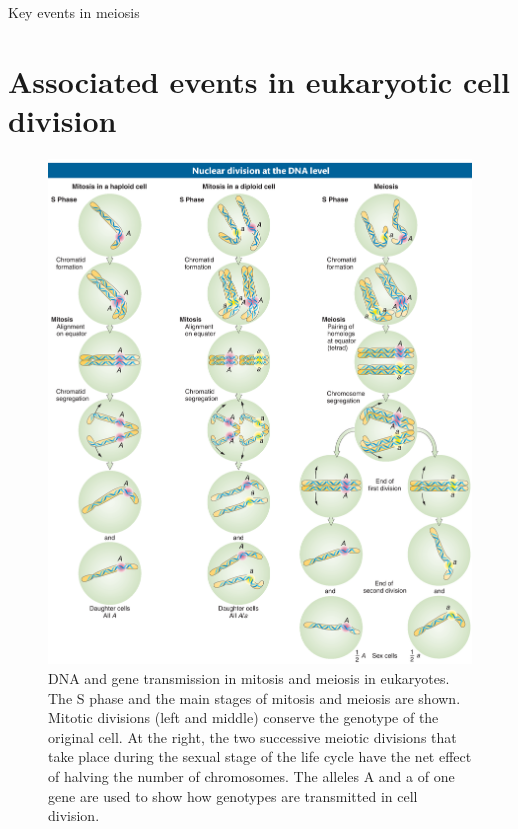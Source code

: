 \documentclass[11pt,ignorenonframetext,aspectratio=169]{beamer}
\begin{document}
\begin{frame}{Key events in meiosis}
\protect\hypertarget{key-events-in-meiosis}{}
\end{frame}

\hypertarget{associated-events-in-eukaryotic-cell-division}{%
\section{Associated events in eukaryotic cell
division}\label{associated-events-in-eukaryotic-cell-division}}

\begin{frame}{}
\protect\hypertarget{section-10}{}
\begin{figure}

{\centering \includegraphics[width=0.45\linewidth]{../images/nuclear_division_dna} 

}

\caption{DNA and gene transmission in mitosis and meiosis in eukaryotes. The S phase and the main stages of mitosis and meiosis are shown. Mitotic divisions (left and middle) conserve the genotype of the original cell. At the right, the two successive meiotic divisions that take place during the sexual stage of the life cycle have the net effect of halving the number of chromosomes. The alleles A and a of one gene are used to show how genotypes are transmitted in cell division.}\label{fig:nuclear-division-dna}
\end{figure}
\end{frame}
\end{document}
